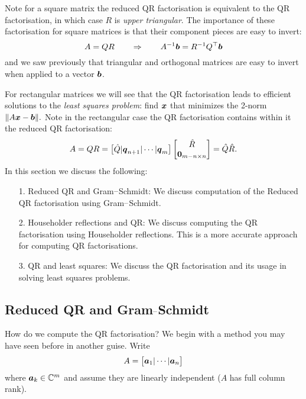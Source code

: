 Note for a square matrix the reduced QR factorisation is equivalent to the QR factorisation, in which case $R$ is \emph{upper triangular}. The importance of these factorisation for square matrices is that their component pieces are easy to invert:
\[
A = QR \qquad \Rightarrow \qquad A^{-1}\bm{{\mbox{\boldmath$b$\unboldmath}}} = R^{-1} Q^\top \bm{{\mbox{\boldmath$b$\unboldmath}}}
\]
and we saw previously that triangular and orthogonal matrices are easy to invert when applied to a vector $\bm{{\mbox{\boldmath$b$\unboldmath}}}$.

For rectangular matrices we will see that the QR factorisation leads to efficient solutions to the \emph{least squares problem}: find $\bm{{\mbox{\boldmath$x$\unboldmath}}}$ that minimizes the 2-norm $\| A \bm{{\mbox{\boldmath$x$\unboldmath}}} - \bm{{\mbox{\boldmath$b$\unboldmath}}} \|.$ Note in the rectangular case the QR factorisation contains within it the reduced QR factorisation:
\[
A = QR = \begin{bmatrix} \hat Q | \bm{{\mbox{\boldmath$q$\unboldmath}}}_{n+1} | \cdots | \bm{{\mbox{\boldmath$q$\unboldmath}}}_m \end{bmatrix} \begin{bmatrix} \hat R \\  \bm{{\mbox{\boldmath$0$\unboldmath}}}_{m-n \times n} \end{bmatrix} = \hat Q \hat R.
\]
In this section we discuss the following:

\begin{itemize}
\item[1. ] Reduced QR and Gram\ensuremath{\endash}Schmidt: We discuss computation of the Reduced QR factorisation using Gram\ensuremath{\endash}Schmidt.


\item[2. ] Householder reflections and QR: We discuss computing the  QR factorisation using Householder reflections. This is a more accurate approach for computing QR factorisations.


\item[3. ] QR and least squares: We discuss the QR factorisation and its usage in solving least squares problems.

\end{itemize}
\subsection{Reduced QR and Gram\ensuremath{\endash}Schmidt}
How do we compute the QR factorisation? We begin with a method you may have seen before in another guise. Write
\[
A = \begin{bmatrix} \bm{{\mbox{\boldmath$a$\unboldmath}}}_1 | \cdots | \bm{{\mbox{\boldmath$a$\unboldmath}}}_n \end{bmatrix}
\]
where $\bm{{\mbox{\boldmath$a$\unboldmath}}}_k \in  {\mathbb C}^m$ and assume they are linearly independent ($A$ has full column rank).

